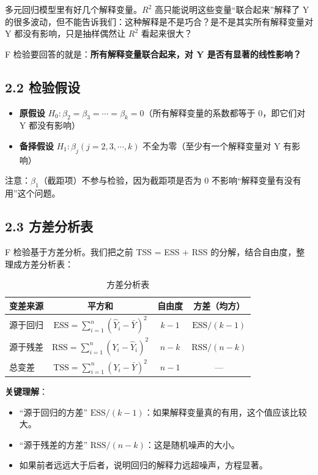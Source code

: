 \documentclass[12pt,a4paper]{ctexart}
\begin{document}
多元回归模型里有好几个解释变量。\(R^2\) 高只能说明这些变量“联合起来”解释了 Y 的很多波动，但不能告诉我们：这种解释是不是巧合？是不是其实所有解释变量对 Y 都没有影响，只是抽样偶然让 \(R^2\) 看起来很大？

F 检验要回答的就是：\textbf{所有解释变量联合起来，对 Y 是否有显著的线性影响？}

\subsection{2.2 检验假设}
\begin{itemize}
    \item \textbf{原假设} \(H_0: \beta_2 = \beta_3 = \cdots = \beta_k = 0\)（所有解释变量的系数都等于 0，即它们对 Y 都没有影响）
    \item \textbf{备择假设} \(H_1: \beta_j (j=2,3,\cdots,k)\) 不全为零（至少有一个解释变量对 Y 有影响）
\end{itemize}
注意：\(\beta_1\)（截距项）不参与检验，因为截距项是否为 0 不影响“解释变量有没有用”这个问题。

\subsection{2.3 方差分析表}

F 检验基于方差分析。我们把之前 TSS = ESS + RSS 的分解，结合自由度，整理成方差分析表：

\begin{table}[htbp]
\centering
\caption{方差分析表}
\begin{tabular}{lccc}
\toprule
\textbf{变差来源} & \textbf{平方和} & \textbf{自由度} & \textbf{方差（均方）} \\
\midrule
源于回归 & \(\displaystyle \text{ESS} = \sum_{i=1}^{n}(\hat{Y}_i - \bar{Y})^2\) & \(k-1\) & \(\text{ESS}/(k-1)\) \\
源于残差 & \(\displaystyle \text{RSS} = \sum_{i=1}^{n}(Y_i - \hat{Y}_i)^2\) & \(n-k\) & \(\text{RSS}/(n-k)\) \\
总变差 & \(\displaystyle \text{TSS} = \sum_{i=1}^{n}(Y_i - \bar{Y})^2\) & \(n-1\) & — \\
\bottomrule
\end{tabular}
\end{table}

\textbf{关键理解}：
\begin{itemize}
    \item “源于回归的方差” \(\text{ESS}/(k-1)\)：如果解释变量真的有用，这个值应该比较大。
    \item “源于残差的方差” \(\text{RSS}/(n-k)\)：这是随机噪声的大小。
    \item 如果前者远远大于后者，说明回归的解释力远超噪声，方程显著。
\end{itemize}
\end{document}

